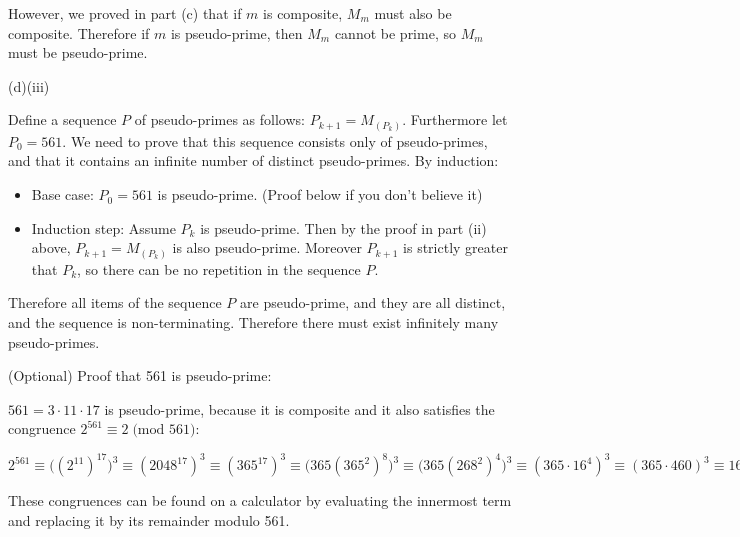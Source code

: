\documentclass{article}
\begin{document}
However, we proved in part (c) that if $m$ is composite, $M_m$ must also be
composite. Therefore if $m$ is pseudo-prime, then $M_m$ cannot be prime,
so $M_m$ must be pseudo-prime.

(d)(iii)

Define a sequence $P$ of pseudo-primes as follows: $P_{k+1} = M_{(P_k)}$.
Furthermore let $P_0 = 561$. We need to prove that this sequence consists
only of pseudo-primes, and that it contains an infinite number of distinct
pseudo-primes. By induction:
\begin{itemize}
\item Base case: $P_0 = 561$ is pseudo-prime. (Proof below if you don't believe it)
\item Induction step: Assume $P_k$ is pseudo-prime. Then by the proof in part (ii)
    above, $P_{k+1} = M_{(P_k)}$ is also pseudo-prime. Moreover $P_{k+1}$ is
    strictly greater that $P_k$, so there can be no repetition in the sequence $P$.
\end{itemize}
Therefore all items of the sequence $P$ are pseudo-prime, and they are all distinct,
and the sequence is non-terminating. Therefore there must exist infinitely many
pseudo-primes.

(Optional) Proof that 561 is pseudo-prime:

$561 = 3 \cdot 11 \cdot 17$ is pseudo-prime, because it is composite and it also
satisfies the congruence $2^{561} \equiv 2 \;\mbox{(mod 561)}$:

$2^{561} \equiv \big((2^{11})^{17}\big)^3 \equiv (2048^{17})^3 \equiv
(365^{17})^3 \equiv \big(365(365^2)^8\big)^3 \equiv \big(365(268^2)^4\big)^3 \equiv
(365\cdot 16^4)^3 \equiv (365 \cdot 460)^3 \equiv 161^3 \equiv 2 \;\mbox{(mod 561)}$

These congruences can be found on a calculator by evaluating the innermost term and
replacing it by its remainder modulo 561.
\end{document}
